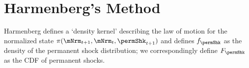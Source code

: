 \documentclass[\econtexRoot/BufferStockTheory]{subfiles}
\begin{document}

\section{Harmenberg's Method}\label{sec:ApndxHarKmenberg}

\newcommand{\permLvlPrb}{p}
\newcommand{\permLvlVec}{\mathrm{p}}
\newcommand{\lomdkPrb}{\pi} 
\newcommand{\lomdkPrbmm}{\varpi} 
\newcommand{\lomdkMat}{\Pi}
\newcommand{\Prb}{f}
\newcommand{\Vct}{\digamma}
\newcommand{\permShkPrb}{\Prb_{\permShk}}
\newcommand{\permShkVec}{\Vct_{\permShk}}
\newcommand{\permShkRawPrb}{\Prb_{\permShk}}
\newcommand{\permShkRawVec}{\Vct_{\permShk}}
\newcommand{\permShkWgtPrb}{\tilde{\Prb}_{\permShk}}
\newcommand{\permShkWgtVec}{\tilde{\Vct}_{\permShk}}
\newcommand{\mpPrb}{\chi}
\newcommand{\mpPrbMarg}{\mpPrb^{\mNrm}}
\newcommand{\Wgt}{\tilde}
\newcommand{\Raw}{}
\newcommand{\mpPrbMargRaw}{\Raw{\mpPrb}^{\mNrm}}
\newcommand{\mpPrbMargWgt}{\Wgt{\mpPrb}^{\mNrm}}
\newcommand{\mpMat}{\mathrm{X}}
\newcommand{\mpMatMarg}{\mpMat^{\mNrm}}
\newcommand{\mpMatMargRaw}{\Raw{\mpMat}^{\mNrm}}
\newcommand{\mpMatMargWgt}{\Wgt{\mpMat}^{\mNrm}}
\newcommand{\mNrmVec}{\mathrm{m}}
\newcommand{\mNrmNow}{\mNrm_{t}}
\newcommand{\mNrmNxt}{\mNrm_{t+1}}
\newcommand{\Bot}{\underline}
\newcommand{\mNrmNxtBot}{\Bot{\mNrm}_{t+1}}
\newcommand{\permShkNow}{\permShk_{t}}
\newcommand{\permShkPrbNxt}{\permShk_{t+1}}
\newcommand{\permShkPrbBot}{\Bot{\permShk}}
\newcommand{\permShkPrbNxtBot}{\Bot{\permShk}_{t+1}}
\newcommand{\permLvlPrbNxt}{\permLvlPrb_{t+1}}
\newcommand{\permLvlPrbNxtBot}{\Bot{\permLvlPrb}_{t+1}}
\newcommand{\permLvlPrbNow}{\permLvlPrb_{t}}
\newcommand{\tranShkNow}{\tranShk_{t}}
\newcommand{\tranShkNxt}{\tranShk_{t+1}}
\newcommand{\mLvlNow}{\mLvl_{t}}
\newcommand{\mLvlNxt}{\mLvl_{t+1}}

Harmenberg defines a `density kernel' describing the law of motion for the normalized state $\lomdkPrb(\mNrmNxt,\mNrmNow,\permShkPrbNxt)$ and defines $\permShkRawPrb$ as the density of the permanent shock distribution; we correspondingly define $F_{\permShk}$ as the CDF of permanent shocks.
\end{document}
